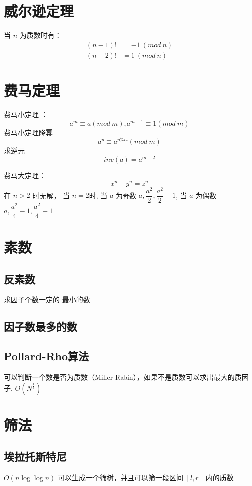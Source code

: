 \documentclass{probook}
\begin{document}
\section{威尔逊定理}
当 $n$ 为质数时有：
$$
\begin{aligned}
(n - 1)! &= -1\ (mod \  n) \\
(n - 2)! &= 1 \ (mod \  n)
\end{aligned}
$$

\section{费马定理}
费马小定理 ：
$$
a^m \equiv a(mod\ m), a^{m - 1} \equiv 1(mod \ m)
$$
费马小定理降幂
$$
a^p \equiv a ^ {p \% m} (mod\ m)
$$
求逆元
$$
inv(a) = a ^ {m - 2}
$$

费马大定理：
$$
x^n + y ^n = z^n
$$
在 $n > 2$ 时无解， 当 $n = 2$时, 当 $a$ 为奇数 $a, \dfrac{a^2}{2}, \dfrac{a^2}{2} + 1$, 当 $a$ 为偶数 $a, \dfrac{a^2}{4} - 1, \dfrac{a^2}{4} + 1$

\section{素数}
\subsection{反素数}
求因子个数一定的 最小的数 

\subsection{因子数最多的数}

\subsection{Pollard-Rho算法}
可以判断一个数是否为质数（Miller-Rabin），如果不是质数可以求出最大的质因子, $O(N^{\frac{1}{4}})$

\section{筛法}
\subsection{埃拉托斯特尼}
$O(n\log \log n)$ 可以生成一个筛树，并且可以筛一段区间 $[l, r]$ 内的质数

\end{document}
